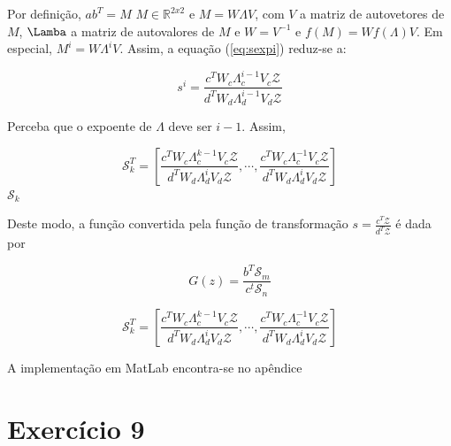 \documentclass{article}
\begin{document}
Por definição, $a b^T = M \,\, M \in \mathbb{R}^{2x2}$ e $M = W \Lambda V$, com $V$ a matriz de autovetores de $M$, $\Lamba$ a matriz de autovalores de $M$ e $W = V^{-1}$ e $f(M) = W f(\Lambda) V$. Em especial, $M^i = W \Lambda^i V$. Assim, a equação (\ref{eq:sexpi}) reduz-se a:

\begin{equation}
s^i = \frac{c^T W_c \Lambda_c^{i-1} V_c \mathcal{Z}}{d^T W_d \Lambda_d^{i-1} V_d \mathcal{Z}}
\end{equation}

Perceba que o expoente de $\Lambda$ deve ser $i - 1$. Assim, 

\begin{equation}
\mathcal{S}_k^T = \left[\frac{c^T W_c \Lambda_c^{k-1} V_c \mathcal{Z}}{d^T W_d \Lambda_d^i V_d \mathcal{Z}}, \cdots, \frac{c^T W_c \Lambda_c^{-1} V_c \mathcal{Z}}{d^T W_d \Lambda_d^i V_d \mathcal{Z}}\right]
\end{equation}
$\mathcal{S}_k$ 

Deste modo, a função convertida pela função de transformação $s = \frac{c^T \mathcal{Z}}{d^T \mathcal{Z}}$ é dada por

\begin{equation}
G(z) = \frac{b^T \mathcal{S}_m}{c^t \mathcal{S}_n}    
\end{equation}

\begin{equation}
\mathcal{S}_k^T = [\frac{c^T W_c \Lambda_c^{k-1} V_c \mathcal{Z}}{d^T W_d \Lambda_d^i V_d \mathcal{Z}}, \cdots, \frac{c^T W_c \Lambda_c^{-1} V_c \mathcal{Z}}{d^T W_d \Lambda_d^i V_d \mathcal{Z}}]
\end{equation}

A implementação em MatLab encontra-se no apêndice 

\section*{Exercício 9}
\end{document}
